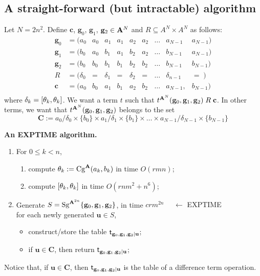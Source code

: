     \subsection{A straight-forward (but intractable) algorithm}
    Let $N = 2n^2$.  Define $\mathbf{c}$, $\mathbf{g}_0$, $\mathbf{g}_1$, $\mathbf{g}_2 \in \mathbf{A}^{N}$
    and $R \subseteq A^{N}\times A^{N}$ as follows:
    \begin{equation}
    \begin{array}{cccccccccc}
      \mathbf{g}_0 &= (a_0 & a_0 &a_1 &a_1 &a_2 &a_2 & \dots & a_{N-1} & a_{N-1}) \\
      \mathbf{g}_1 &= (b_0 & a_0 &b_1 &a_1 &b_2 &a_2 & \dots & b_{N-1} & a_{N-1}) \\
      \mathbf{g}_2 &= (b_0 & b_0 &b_1 &b_1 &b_2 &b_2 & \dots & b_{N-1} & b_{N-1})\\[4pt]
        R  & = (\delta_0 & =  & \delta_1 & = & \delta_2 & = & \dots  & \delta_{n-1} & = \; )\\ [4pt]
      \mathbf{c}            & = (a_0     & b_0       & a_1      & b_1      & a_2      & b_2      & \dots  & a_{N-1}, & b_{N-1}) \\
    \end{array}
    \end{equation}
    where $\delta_k= [\theta_k, \theta_k]$.  We want a term $t$ such that $t^{\mathbf{A}^{N}}(\mathbf{g}_0, \mathbf{g}_1, \mathbf{g}_2)\mathrel{R} \mathbf{c}$.
    In other terms, we want that $t^{\mathbf{A}^{N}}(\mathbf{g}_0, \mathbf{g}_1, \mathbf{g}_2)$ belongs to the set
    \[
    \mathbf{C} := a_0/\delta_0 \times \{b_0\} \times a_1/\delta_1 \times \{b_1\} \times   \dots \times a_{N-1}/\delta_{N-1} \times \{b_{N-1}\}
    \]

    \noindent \textbf{An {\small EXPTIME} algorithm.}
     \begin{enumerate}
       \item For $0\leq k < n$,
       \begin{enumerate}
         \item compute $\theta_k:= \operatorname{Cg}^{\mathbf{A}}(a_k, b_k)$ in time $O(rmn)$;
         \item compute $[ \theta_k ,  \theta_k ]$ in time $O(rnm^2 + n^6)$;
       \end{enumerate}
    \item Generate $S=\operatorname{Sg}^{\mathbf{A}^{2n}} \{\mathbf{g}_0, \mathbf{g}_1, \mathbf{g}_2\}$,
      in time $c r m^{2n}$ {\tiny {\color{red} $\quad \leftarrow$ EXPTIME}}\\
    for each newly generated $\mathbf{u} \in S$,
      \begin{itemize}
      \item construct/store the table
        $\mathsf{t}_{\mathbf{g}_0, \mathbf{g}_1, \mathbf{g}_2|\mathbf{u}}$;
      \item if $\mathbf{u} \in \mathbf{C}$, then return     $\mathsf{t}_{\mathbf{g}_0, \mathbf{g}_1, \mathbf{g}_2|\mathbf{u}}$;
      \end{itemize}
    \end{enumerate}
    Notice that, if $\mathbf{u} \in \mathbf{C}$, then $\mathsf{t}_{\mathbf{g}_0, \mathbf{g}_1, \mathbf{g}_2|\mathbf{u}}$  is the table of a difference term operation.

